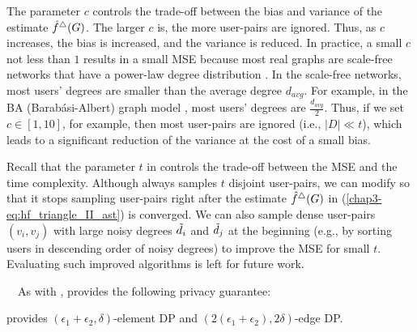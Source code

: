 The parameter $c$ controls the trade-off between the bias and variance of the estimate $\hat{f}^\triangle(G)$.
The larger $c$ is, the more user-pairs are ignored.
Thus, as $c$ increases, the bias is increased, and the variance is reduced.
In practice,
a small $c$ not less than $1$ 
results in a small MSE %
because most real graphs are scale-free networks that have a power-law degree distribution \cite{NetworkScience}.
In the scale-free networks, most users' degrees are smaller than the average degree $d_{avg}$.
For example, in the BA (Barab\'{a}si-Albert) graph model \cite{NetworkScience,Hagberg_SciPy08},
most users' degrees are $\frac{d_{avg}}{2}$.
Thus, if we set
$c \in [1,10]$, for example,
then most user-pairs are ignored (i.e., $|D| \ll t$), which leads to a significant reduction of the variance at the cost of a small bias.

Recall that the parameter $t$ in \AlgWSTriVR{} controls the trade-off between the MSE and the time complexity. 
Although \AlgWSTriVR{} always samples $t$ disjoint user-pairs, we can modify \AlgWSTriVR{} so that it stops sampling user-pairs right after the estimate $\hat{f}^\triangle(G)$ in (\ref{chap3-eq:hf_triangle_II_ast}) is converged. 
We can also sample dense user-pairs $(v_i, v_j)$ with large noisy degrees $\tilde{d}_i$ and $\tilde{d}_j$ at the beginning (e.g., by sorting users in descending order of noisy degrees) to improve the MSE for small $t$. 
Evaluating such improved algorithms is left for future work. 

\smallskip
{}~~As with \AlgWSTri{},
\AlgWSTriVR{} provides the following privacy guarantee:

\begin{theorem}
\label{chap3-thm:DP_II_ast}
\AlgWSTriVR{} provides $(\epsilon_1 + \epsilon_2, \delta)$-element DP and $(2(\epsilon_1 + \epsilon_2), 2\delta)$-edge DP.
\end{theorem}

